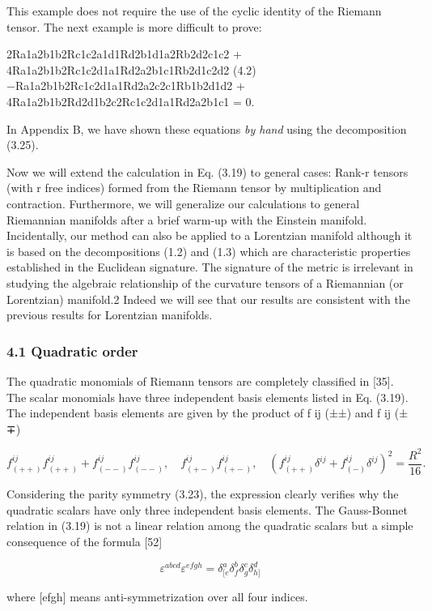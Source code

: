 \documentclass{article}
\begin{document}
This example does not require the use of the cyclic identity of the Riemann tensor. The next example is more difficult to prove:

2Ra1a2b1b2Rc1c2a1d1Rd2b1d1a2Rb2d2c1c2 + 4Ra1a2b1b2Rc1c2d1a1Rd2a2b1c1Rb2d1c2d2 (4.2) −Ra1a2b1b2Rc1c2d1a1Rd2a2c2c1Rb1b2d1d2 + 4Ra1a2b1b2Rd2d1b2c2Rc1c2d1a1Rd2a2b1c1 = 0.

In Appendix B, we have shown these equations \textit{by hand} using the decomposition (3.25).

Now we will extend the calculation in Eq. (3.19) to general cases: Rank-r tensors (with r free indices) formed from the Riemann tensor by multiplication and contraction. Furthermore, we will generalize our calculations to general Riemannian manifolds after a brief warm-up with the Einstein manifold. Incidentally, our method can also be applied to a Lorentzian manifold although it is based on the decompositions (1.2) and (1.3) which are characteristic properties established in the Euclidean signature. The signature of the metric is irrelevant in studying the algebraic relationship of the curvature tensors of a Riemannian (or Lorentzian) manifold.2 Indeed we will see that our results are consistent with the previous results for Lorentzian manifolds.

\subsubsection{4.1 Quadratic order}

The quadratic monomials of Riemann tensors are completely classified in [35]. The scalar monomials have three independent basis elements listed in Eq. (3.19). The independent basis elements are given by the product of f ij (±±) and f ij (±∓)

$$f^{ij}_{(++)}f^{ij}_{(++)}+f^{ij}_{(--)}f^{ij}_{(--)},\quad f^{ij}_{(+-)}f^{ij}_{(+-)},\quad(f^{ij}_{(++)}\delta^{ij}+f^{ij}_{(-)}\delta^{ij})^{2}=\frac{R^{2}}{16}.\tag{4.3}$$

Considering the parity symmetry (3.23), the expression clearly verifies why the quadratic scalars have only three independent basis elements. The Gauss-Bonnet relation in (3.19) is not a linear relation among the quadratic scalars but a simple consequence of the formula [52]

$$\varepsilon^{a b c d}\varepsilon^{e f g h}=\delta_{[e}^{a}\delta_{f}^{b}\delta_{g}^{c}\delta_{h]}^{d}$$

where [efgh] means anti-symmetrization over all four indices.
\end{document}

